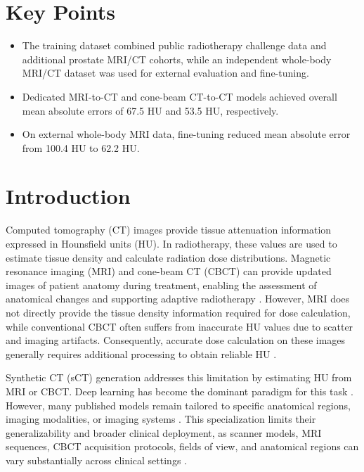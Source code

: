 \documentclass{article}
\begin{document}
\section*{Key Points}
\begin{itemize}
    \item The training dataset combined public radiotherapy challenge data and additional prostate MRI/CT cohorts, while an independent whole-body MRI/CT dataset was used for external evaluation and fine-tuning.
    \item Dedicated MRI-to-CT and cone-beam CT-to-CT models achieved overall mean absolute errors of 67.5 HU and 53.5 HU, respectively.
    \item On external whole-body MRI data, fine-tuning reduced mean absolute error from 100.4 HU to 62.2 HU.
\end{itemize}

\section{Introduction}


Computed tomography (CT) images provide tissue attenuation information expressed in Hounsfield units (HU). In radiotherapy, these values are used to estimate tissue density and calculate radiation dose distributions. Magnetic resonance imaging (MRI) and cone-beam CT (CBCT) can provide updated images of patient anatomy during treatment, enabling the assessment of anatomical changes and supporting adaptive radiotherapy \cite{keall2022integrated,jaffray2012image}. However, MRI does not directly provide the tissue density information required for dose calculation, while conventional CBCT often suffers from inaccurate HU values due to scatter and imaging artifacts. Consequently, accurate dose calculation on these images generally requires additional processing to obtain reliable HU \cite{edmund2017review,giacometti2020review}.

Synthetic CT (sCT) generation addresses this limitation by estimating HU from MRI or CBCT. Deep learning has become the dominant paradigm for this task \cite{edmund2017review,spadea2021deep}. However, many published models remain tailored to specific anatomical regions, imaging modalities, or imaging systems \cite{boulanger2021deep,spadea2021deep}. This specialization limits their generalizability and broader clinical deployment, as scanner models, MRI sequences, CBCT acquisition protocols, fields of view, and anatomical regions can vary substantially across clinical settings \cite{olin2021robustness}.
\end{document}
